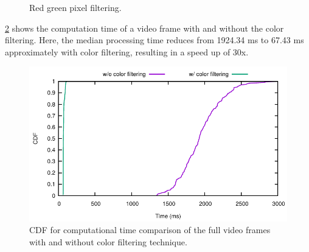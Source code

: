 \begin{figure}[!ht]
\centering
{}
\hfill
{}
\caption{Red green pixel filtering.}
\label{f:fil_img}
\end{figure}


\ref{f:clrfil} shows the computation time of a video frame with and without the color filtering. 
Here, the median processing time reduces from 1924.34 ms to 67.43 ms approximately with color filtering, resulting in a speed up of 30x. 


\begin{figure}[h]
\centering
\includegraphics[width=5.2in]{plots/cdf_clrfil_full.pdf}
\caption{CDF for computational time comparison of the full video frames with and without color filtering technique.}
\label{f:clrfil}
\end{figure}


